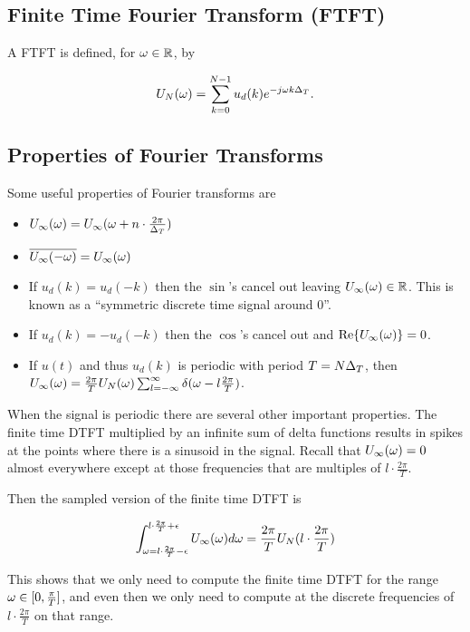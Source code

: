 \subsection{Finite Time Fourier Transform (FTFT)}
A FTFT is defined, for $\omega\in\mathbb{R}$, by

\begin{equation*}
U_N(\omega) = \sum_{k=0}^{N-1} u_d(k) e^{-j\omega k\Delta_T}.
\end{equation*}

\subsection{Properties of Fourier Transforms}
Some useful properties of Fourier transforms are
\begin{itemize}
\item $U_\infty(\omega) = U_\infty(\omega + n\cdot \frac{2\pi}{\Delta_T})$
\item $\overline{U_\infty(-\omega)} = U_\infty(\omega)$
\item If $u_d(k) = u_d(-k)$ then the $\sin$'s cancel out leaving $U_\infty(\omega)\in\mathbb{R}$.
  This is known as a ``symmetric discrete time signal around $0$''.
\item If $u_d(k) = -u_d(-k)$ then the $\cos$'s cancel out and $\text{Re}\lbrace U_\infty(\omega)\rbrace = 0$.
\item If $u(t)$ and thus $u_d(k)$ is periodic with period $T=N\Delta_T$, then $U_\infty(\omega) = \frac{2\pi}{T}U_N(\omega) \sum_{l=-\infty}^\infty \delta(\omega-l\frac{2\pi}{T})$.
\end{itemize}
When the signal is periodic there are several other important properties.
The finite time DTFT multiplied by an infinite sum of delta functions results in spikes at the points where there is a sinusoid in the signal.
Recall that $U_\infty(\omega)=0$ almost everywhere except at those frequencies that are multiples of $l\cdot \frac{2\pi}{T}$.

Then the sampled version of the finite time DTFT is

\begin{equation*}
\int_{\omega=l\cdot \frac{2\pi}{T}-\epsilon}^{l\cdot \frac{2\pi}{T}+\epsilon} U_\infty(\omega)d\omega
= \frac{2\pi}{T}U_N(l\cdot \frac{2\pi}{T})
\end{equation*}

This shows that we only need to compute the finite time DTFT for the range $\omega\in[0,\frac{\pi}{T}]$, and even then we only need to compute at the discrete frequencies of $l\cdot\frac{2\pi}{T}$ on that range.

